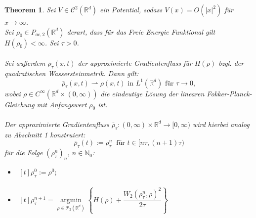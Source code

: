 \documentclass[11pt,a4paper,notitlepage]{scrreprt}
\newcommand{\RR}{\mathbb{R}}
\newcommand{\NN}{\mathbb{N}}
\newtheorem{theorem}[defi]{Theorem}
\begin{document}
\begin{theorem}
Sei $V\in \mathcal{C}^2(\RR^d)$ ein Potential, sodass $V(x)=O(\vert x \vert^2)$ für $x\to\infty$. \\
Sei $\rho_0\in P_{ac,2}(\RR^d)$ derart, dass für das Freie Energie Funktional gilt $H(\rho_0)<\infty$. Sei $\tau>0$.\\\\
Sei außerdem $\bar{\rho}_\tau(x,t)$ der approximierte Gradientenfluss für $H(\rho)$ bzgl. der quadratischen Wassersteinmetrik. 
Dann gilt: \\
\begin{equation*}
\bar{\rho}_\tau(x,t)\rightharpoonup \rho(x,t) \text{ in } L^1(\RR^d) \text{ für } \tau\to 0,
\end{equation*}
wobei $\rho\in C^\infty(\RR^d\times(0,\infty))$ die eindeutige Lösung der linearen Fokker-Planck-Gleichung mit Anfangswert $\rho_0$ ist. \\\\
Der approximierte Gradientenfluss $\bar{\rho}_\tau:(0,\infty)\times\RR^d\to[0,\infty)$ wird hierbei analog zu Abschnitt 1 konstruiert:
\begin{equation*}
\bar{\rho}_\tau(t):=\rho_\tau^n ~\text{ für }t\in[n\tau,(n+1)\tau)
\end{equation*}
für die Folge $(\rho_\tau^n)_n,~n\in\NN_0$:
\begin{itemize}
\item[i)]$\begin{aligned}[t]\rho_\tau^0:=\rho^0; \end{aligned}$
\item[ii)]$\begin{aligned}[t]
\rho_\tau^{n+1}=\underset{\rho\in\mathcal{P}_{2}(\RR^d)}{\operatorname{argmin}}\left\{H(\rho)+\dfrac{W_2(\rho_\tau^n,\rho)^2}{2\tau}\right\}
\end{aligned}$\end{itemize}
\end{theorem}
\end{document}

